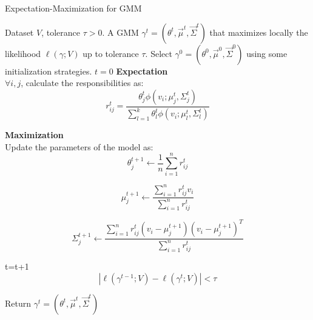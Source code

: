 \documentclass{article}
\begin{document}
\pagestyle{empty} 
\begin{algorithm}[ht]
	\caption{Expectation-Maximization for GMM} \label{GMMEM}
	\begin{algorithmic}[1]

		\Require  Dataset $V$, tolerance $\tau >0$.
		\Ensure A GMM $\gamma^t= (\theta^t, \vec \mu^t, \vec \Sigma^t )$ that maximizes locally the likelihood $\ell(\gamma;V)$ up to tolerance $\tau$.
		\vspace{10pt}
		\Statex Select $\gamma^0=(\theta^0, \vec \mu^{0}, \vec \Sigma^{0} )$ using some initialization strategies. 
		\State $t=0$
		\Repeat %
		\State \textbf{ Expectation}\\
		$\forall i,j$, calculate the responsibilities as:
		\begin{equation}\label{responsibility}
			r_{ij}^t = \frac{\theta^t_j \phi(v_i; \mu^t_j, \Sigma^t_j )}{\sum_{l=1}^k \theta^t_l \phi(v_i; \mu^t_l, \Sigma^t_l)}
		\end{equation}

		\State \textbf{ Maximization}\\
		Update the parameters of the model as:
		\begin{equation}
			\theta_j^{t+1} \leftarrow \frac{1}{n}\sum_{i=1}^n r^{t}_{ij}
		\end{equation}

		\begin{equation}
			\mu_j^{t+1} \leftarrow \frac{\sum_{i=1}^n r^{t}_{ij} v_i }{ \sum_{i=1}^n r^{t}_{ij}}
		\end{equation}

		\begin{equation}
			\Sigma_j^{t+1} \leftarrow \frac{\sum_{i=1}^n r^{t}_{ij} (v_i - \mu_j^{t+1})(v_i - \mu_j^{t+1})^T }{ \sum_{i=1}^n r^{t}_{ij}}
		\end{equation}


		\State t=t+1
		\Until {$\: $}
		\State \begin{equation} | \ell(\gamma^{t-1};V) - \ell(\gamma^t;V) | < \tau \end{equation}

			\State Return $\gamma^{t}=(\theta^t, \vec \mu^t, \vec \Sigma^t )$
	\end{algorithmic}
\end{algorithm}
\end{document}
